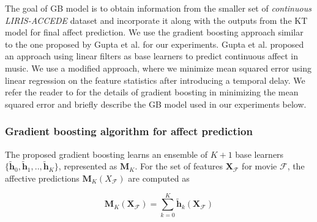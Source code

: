 \documentclass{article}
\begin{document}
\begin{spacing}{0.9}

The goal of GB model is to obtain information from the smaller set of {\it continuous LIRIS-ACCEDE} dataset and incorporate it along with the outputs from the KT model for final affect prediction.
We use the gradient boosting approach similar to the one proposed by Gupta et al. \cite{gupta2015affect} for our experiments.
Gupta et al. \cite{gupta2015affect} proposed an approach using linear filters as base learners to predict continuous affect in music. 
We use a modified approach, where we minimize mean squared error using linear regression on the feature statistics after introducing a temporal delay.
We refer the reader to \cite{friedman2001greedy,gupta2015affect} for the details of gradient boosting in minimizing the mean squared error and briefly describe the GB model used in our experiments below. 

\vspace{-2mm}
\subsubsection{Gradient boosting algorithm for affect prediction}
\vspace{-2mm}
The proposed gradient boosting learns an ensemble of $K+1$ base learners $\{\tilde{\bm h}_0, \tilde{\bm h}_1, .., \tilde{\bm h}_K\}$, represented as $\bm M_K$. 
For the set of features ${\bm X}_{\mathcal F}$ for movie $\mathcal F$, the affective predictions $\bm M_K(X_{\mathcal F})$ are computed as  

\begin{equation}
\bm M_K(\bm X_{\mathcal F}) = \sum_{k=0}^K \tilde{\bm h}_k(\bm X_\mathcal F)
\end{equation}


\end{spacing}
\end{document}
